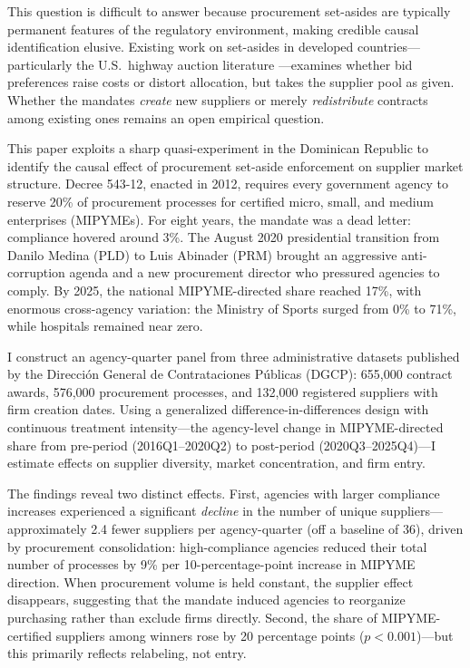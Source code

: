 \documentclass[12pt]{article}
\begin{document}
This question is difficult to answer because procurement set-asides are typically permanent features of the regulatory environment, making credible causal identification elusive. Existing work on set-asides in developed countries---particularly the U.S.\ highway auction literature \citep{krasnokutskaya2011bid, marion2007bid, nakabayashi2013small, athey2013set}---examines whether bid preferences raise costs or distort allocation, but takes the supplier pool as given. Whether the mandates \textit{create} new suppliers or merely \textit{redistribute} contracts among existing ones remains an open empirical question.

This paper exploits a sharp quasi-experiment in the Dominican Republic to identify the causal effect of procurement set-aside enforcement on supplier market structure. Decree 543-12, enacted in 2012, requires every government agency to reserve 20\% of procurement processes for certified micro, small, and medium enterprises (MIPYMEs). For eight years, the mandate was a dead letter: compliance hovered around 3\%. The August 2020 presidential transition from Danilo Medina (PLD) to Luis Abinader (PRM) brought an aggressive anti-corruption agenda and a new procurement director who pressured agencies to comply. By 2025, the national MIPYME-directed share reached 17\%, with enormous cross-agency variation: the Ministry of Sports surged from 0\% to 71\%, while hospitals remained near zero.

I construct an agency-quarter panel from three administrative datasets published by the Direcci\'{o}n General de Contrataciones P\'{u}blicas (DGCP): 655,000 contract awards, 576,000 procurement processes, and 132,000 registered suppliers with firm creation dates. Using a generalized difference-in-differences design with continuous treatment intensity---the agency-level change in MIPYME-directed share from pre-period (2016Q1--2020Q2) to post-period (2020Q3--2025Q4)---I estimate effects on supplier diversity, market concentration, and firm entry.

The findings reveal two distinct effects. First, agencies with larger compliance increases experienced a significant \textit{decline} in the number of unique suppliers---approximately 2.4 fewer suppliers per agency-quarter (off a baseline of 36), driven by procurement consolidation: high-compliance agencies reduced their total number of processes by 9\% per 10-percentage-point increase in MIPYME direction. When procurement volume is held constant, the supplier effect disappears, suggesting that the mandate induced agencies to reorganize purchasing rather than exclude firms directly. Second, the share of MIPYME-certified suppliers among winners rose by 20 percentage points ($p < 0.001$)---but this primarily reflects relabeling, not entry.
\end{document}
